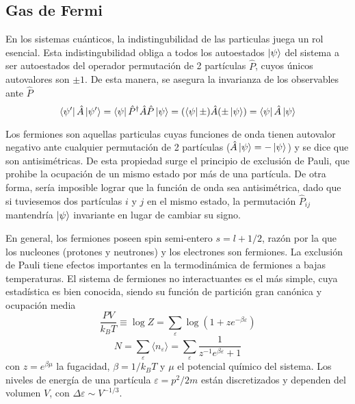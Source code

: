 \subsection{Gas de Fermi}{\label{sec:intro_fermi_gas}}

En los sistemas cuánticos, la indistingubilidad de las particulas juega un rol esencial.
Esta indistingubilidad obliga a todos los autoestados $\ket{\psi}$ del sistema a ser autoestados del operador permutación de 2 partículas $\hat{P}$, cuyos únicos autovalores son $\pm 1$.
De esta manera, se asegura la invarianza de los observables ante $\hat{P}$
\[\bra{\psi'}\hat{A}\ket{\psi'} = \bra{\psi}\hat{P}^\dagger\hat{A}\hat{P}\ket{\psi} = (\bra{\psi}\pm)\hat{A}(\pm\ket{\psi}) = \bra{\psi}\hat{A}\ket{\psi}\]

Los fermiones son aquellas particulas cuyas funciones de onda tienen autovalor negativo ante cualquier permutación de 2 partículas ($\hat{A}\ket{\psi} = -\ket{\psi}$) y se dice que son antisimétricas.
De esta propiedad surge el principio de exclusión de Pauli, que prohibe la ocupación de un mismo estado por más de una partícula. 
De otra forma, sería imposible lograr que la función de onda sea antisimétrica, dado que si tuviesemos dos partículas $i$ y $j$ en el mismo estado, la permutación $\hat{P}_{ij}$ mantendría
$\ket{\psi}$ invariante en lugar de cambiar su signo.

En general, los fermiones poseen spin semi-entero $s=l+1/2$, razón por la que los nucleones (protones y neutrones) y los electrones son fermiones. 
La exclusión de Pauli tiene efectos importantes en la termodinámica de fermiones a bajas temperaturas.
El sistema de fermiones no interactuantes es el más simple, cuya estadística es bien conocida, siendo su función de partición gran canónica y ocupación media
\begin{equation}
 \frac{PV}{k_BT} \equiv \log Z = \sum_\varepsilon \log(1+ze^{-\beta\varepsilon})
\end{equation}
\begin{equation}
 N = \sum_\varepsilon \langle n_\varepsilon\rangle = \sum_\varepsilon \frac{1}{z^{-1}e^{\beta\varepsilon}+1}
\end{equation}
con $z=e^{\beta\mu}$ la fugacidad, $\beta=1/k_BT$ y $\mu$ el potencial químico del sistema. 
Los niveles de energía de una partícula $\varepsilon=p^2/2m$ están discretizados y dependen del volumen $V$, con $\Delta\varepsilon\sim V^{-1/3}$.


